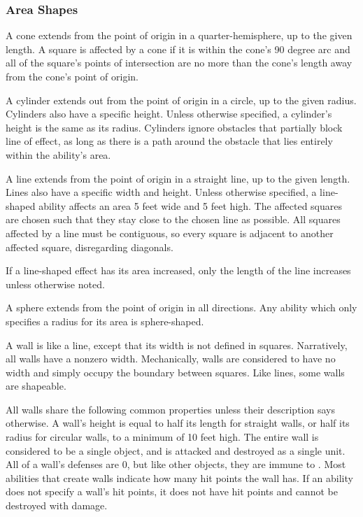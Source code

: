         \subsubsection{Area Shapes}\label{Area Shapes}

             A cone extends from the point of origin in a quarter-hemisphere, up to the given length.
            A square is affected by a cone if it is within the cone's 90 degree arc and all of the square's points of intersection are no more than the cone's length away from the cone's point of origin.

             A cylinder extends out from the point of origin in a circle, up to the given radius.
            Cylinders also have a specific height.
            Unless otherwise specified, a cylinder's height is the same as its radius.
            Cylinders ignore obstacles that partially block line of effect, as long as there is a path around the obstacle that lies entirely within the ability's area.

             A line extends from the point of origin in a straight line, up to the given length.
            Lines also have a specific width and height.
            Unless otherwise specified, a line-shaped ability affects an area 5 feet wide and 5 feet high.
            The affected squares are chosen such that they stay close to the chosen line as possible.
            All squares affected by a line must be contiguous, so every square is adjacent to another affected square, disregarding diagonals.

            If a line-shaped effect has its area increased, only the length of the line increases unless otherwise noted.

             A sphere extends from the point of origin in all directions.
            Any ability which only specifies a radius for its area is sphere-shaped.

             A wall is like a line, except that its width is not defined in squares.
            Narratively, all walls have a nonzero width.
            Mechanically, walls are considered to have no width and simply occupy the boundary between squares.
            Like lines, some walls are shapeable.

            All walls share the following common properties unless their description says otherwise.
            A wall's height is equal to half its length for straight walls, or half its radius for circular walls, to a minimum of 10 feet high.
            The entire wall is considered to be a single object, and is attacked and destroyed as a single unit.
            All of a wall's defenses are 0, but like other objects, they are immune to .
            Most abilities that create walls indicate how many hit points the wall has.
            If an ability does not specify a wall's hit points, it does not have hit points and cannot be destroyed with damage.


